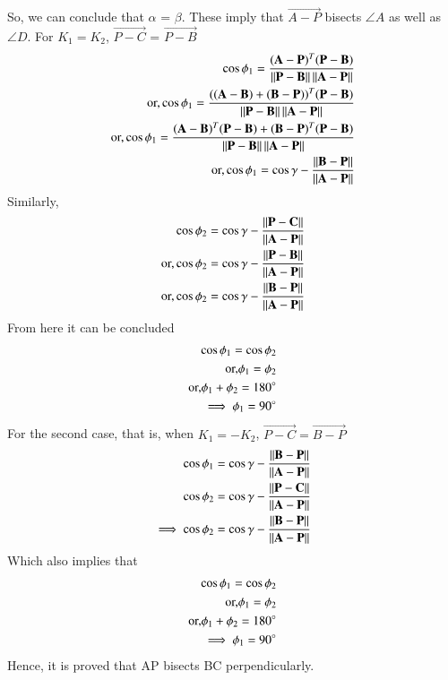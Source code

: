 \documentclass[journal,12pt,twocolumn]{IEEEtran}
\renewcommand\thesection{\arabic{section}}
\begin{document}
So, we can conclude that $\alpha$ = $\beta$.
These imply that $\vec{A-P}$ bisects $\angle A$ as well as $\angle D$.
For $K_1 = K_2$, $\vec{P-C}$ = $\vec{P-B}$
\begin{align}
\cos\phi_1 = \frac{(\mathbf{A-P})^T (\mathbf{P-B})}{\left\lVert\mathbf{P-B}\right\rVert\left\lVert\mathbf{A-P}\right\rVert}\\
\text{or,}\cos\phi_1 = \frac{((\mathbf{A-B}) + (\mathbf{B-P}))^T (\mathbf{P-B})}{\left\lVert\mathbf{P-B}\right\rVert\left\lVert\mathbf{A-P}\right\rVert}\\
\text{or,}\cos\phi_1 = \frac{(\mathbf{A-B})^T (\mathbf{P-B})+ (\mathbf{B-P})^T (\mathbf{P-B})}{\left\lVert\mathbf{P-B}\right\rVert\left\lVert\mathbf{A-P}\right\rVert}\\
\text{or,}\cos\phi_1 = \cos\gamma - \frac{\left\lVert\mathbf{B-P}\right\rVert}{\left\lVert\mathbf{A-P}\right\rVert}\\
\end{align}
Similarly,
\begin{align}
\cos\phi_2 = \cos\gamma - \frac{\left\lVert\mathbf{P-C}\right\rVert}{\left\lVert\mathbf{A-P}\right\rVert}\\
\text{or,}\cos\phi_2 = \cos\gamma - \frac{\left\lVert\mathbf{P-B}\right\rVert}{\left\lVert\mathbf{A-P}\right\rVert}\\
\text{or,}\cos\phi_2 = \cos\gamma - \frac{\left\lVert\mathbf{B-P}\right\rVert}{\left\lVert\mathbf{A-P}\right\rVert}\\
\end{align} 
From here it can be concluded
\begin{align}
\cos\phi_1=\cos\phi_2\\
\text{or,}\phi_1=\phi_2\\
\text{or,}\phi_1 + \phi_2 = 180 \degree\\
\implies \phi_1 = 90 \degree
\end{align}
For the second case, that is, when $K_1=-K_2$,
$\vec{P-C} = \vec{B-P}$
\begin{align}
\cos\phi_1 = \cos\gamma - \frac{\left\lVert\mathbf{B-P}\right\rVert}{\left\lVert\mathbf{A-P}\right\rVert}\\
\cos\phi_2 = \cos\gamma - \frac{\left\lVert\mathbf{P-C}\right\rVert}{\left\lVert\mathbf{A-P}\right\rVert}\\
\implies \cos\phi_2 = \cos\gamma - \frac{\left\lVert\mathbf{B-P}\right\rVert}{\left\lVert\mathbf{A-P}\right\rVert}\\
\end{align} 
Which also implies that 
\begin{align}
\cos\phi_1=\cos\phi_2\\
\text{or,}\phi_1=\phi_2\\
\text{or,}\phi_1 + \phi_2 = 180 \degree\\
\implies \phi_1 = 90 \degree
\end{align}
Hence, it is proved that AP bisects BC perpendicularly.
\renewcommand{\theequation}{\theenumi}
%
\end{document}
